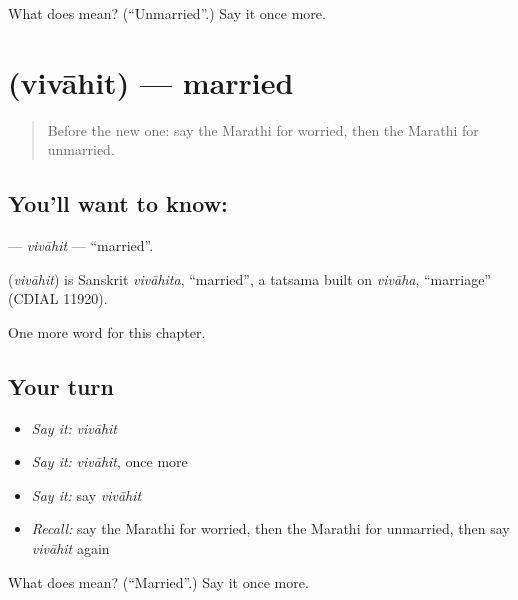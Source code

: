 \begin{tcolorbox}[breakable,colback=teal!4,colframe=teal!35!black,title={Before you move on}]
What does  mean? (\textquotedblleft{}Unmarried\textquotedblright{}.) Say it once more.
\end{tcolorbox}
\section[\texorpdfstring{\mr{विवाहित} (vivāhit)}{विवाहित (vivāhit)}]{ (vivāhit) — married}

\label{lesson:MR-C260-vivahit}



\begin{quote}
Before the new one: say the Marathi for worried, then the Marathi for unmarried.
\end{quote}

\subsection*{You'll want to know: }
\textbf{} — \emph{vivāhit} — \textquotedblleft{}married\textquotedblright{}.

\begin{cousinweb}
\textbf{} (\emph{vivāhit}) is Sanskrit \emph{vivāhita}, \textquotedblleft{}married\textquotedblright{}, a tatsama built on \emph{vivāha}, \textquotedblleft{}marriage\textquotedblright{} (CDIAL 11920).
\end{cousinweb}

\begin{grammarlens}[title={What you've built}]
One more word for this chapter.
\end{grammarlens}

\subsection*{Your turn}
\begin{itemize}
\raggedright
  \item \emph{Say it:} \emph{vivāhit}
  \item \emph{Say it:} \emph{vivāhit}, once more
  \item \emph{Say it:} say \emph{vivāhit}
  \item \emph{Recall:} say the Marathi for worried, then the Marathi for unmarried, then say \emph{vivāhit} again
\end{itemize}

\begin{tcolorbox}[breakable,colback=teal!4,colframe=teal!35!black,title={Before you move on}]
What does  mean? (\textquotedblleft{}Married\textquotedblright{}.) Say it once more.
\end{tcolorbox}
